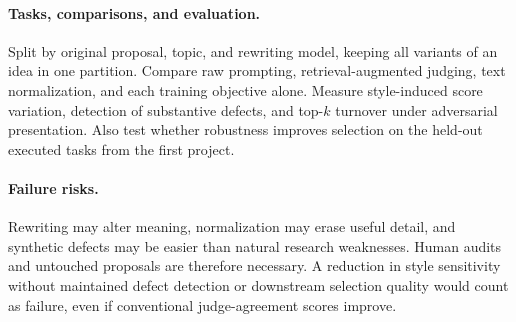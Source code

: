 \paragraph{Tasks, comparisons, and evaluation.}
Split by original proposal, topic, and rewriting model, keeping all variants of an idea in one partition. Compare raw prompting, retrieval-augmented judging, text normalization, and each training objective alone. Measure style-induced score variation, detection of substantive defects, and top-$k$ turnover under adversarial presentation. Also test whether robustness improves selection on the held-out executed tasks from the first project.

\paragraph{Failure risks.}
Rewriting may alter meaning, normalization may erase useful detail, and synthetic defects may be easier than natural research weaknesses. Human audits and untouched proposals are therefore necessary. A reduction in style sensitivity without maintained defect detection or downstream selection quality would count as failure, even if conventional judge-agreement scores improve.
